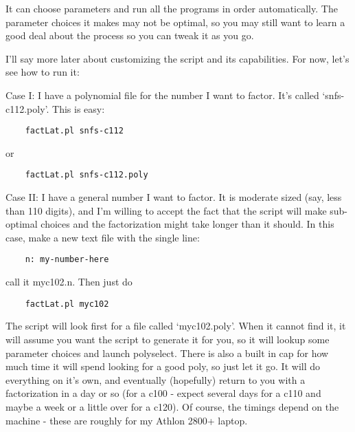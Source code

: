 \documentclass[12pt]{article}
\begin{document}
 

  It can choose parameters and run all the programs in 
  order automatically. The parameter choices it makes
  may not be optimal, so you may still want to learn a good
  deal about the process so you can tweak it as you go.
  
  I'll say more later about customizing the script and its
  capabilities. For now, let's see how to run it:

  Case I: I have a polynomial file for the number I want to
  factor. It's called `snfs-c112.poly'. This is easy:
  \begin{verbatim}
    factLat.pl snfs-c112
  \end{verbatim}
  or
  \begin{verbatim}
    factLat.pl snfs-c112.poly
  \end{verbatim}

  Case II: I have a general number I want to factor. It is moderate
  sized (say, less than 110 digits), and I'm willing to accept the
  fact that the script will make sub-optimal choices and the factorization
  might take longer than it should. In this case, make a new text file with
  the single line:
  \begin{verbatim}
    n: my-number-here
  \end{verbatim}
  call it myc102.n. Then just do 
  \begin{verbatim}
    factLat.pl myc102
  \end{verbatim}
  The script will look first for a file called `myc102.poly'. When it cannot
  find it, it will assume you want the script to generate it for you, so it
  will lookup some parameter choices and launch polyselect. There is also
  a built in cap for how much time it will spend looking for a good poly,
  so just let it go. It will do everything on it's own, and eventually
  (hopefully) return to you with a factorization in a day or so (for a c100 - 
  expect several days for a c110 and maybe a week or a little over for a
  c120). Of course, the timings depend on the machine - these are roughly
  for my Athlon 2800+ laptop.
\end{document}

